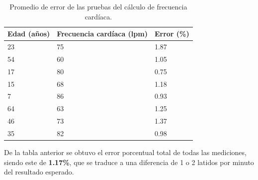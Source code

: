 \begin{table}[htbp]
	\begin{center}
		\begin{tabular}{|l|l|l|}
			\hline
			\textbf{Edad (años)} & \textbf{Frecuencia cardíaca (lpm)} & \textbf{Error (\%)} \\
			\hline \hline
			23 & 75 & 1.87 \\
			\hline
			54 & 60 & 1.05 \\
			\hline
			17 & 80 & 0.75 \\
			\hline
			15 & 68 & 1.18\\
			\hline
			7 & 86 & 0.93 \\
			\hline
			64 & 63 & 1.25 \\
			\hline
			46 & 73 & 1.37 \\
			\hline
			35 & 82 & 0.98 \\
			\hline
		\end{tabular}
		\caption{Promedio de error de las pruebas del cálculo de frecuencia cardíaca.}
		\label{sensorPulso:promedioError}
	\end{center}
\end{table}

De la tabla anterior se obtuvo el error porcentual total de todas las mediciones, siendo este de \textbf{1.17\%}, que se traduce a una diferencia de 1 o 2 latidos por minuto del resultado esperado. \\